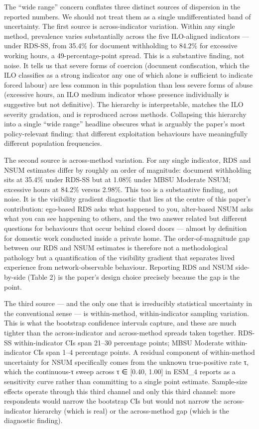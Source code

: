 \documentclass[
  12pt,
  letterpaper,
  DIV=11,
  numbers=noendperiod]{scrartcl}
\begin{document}
The ``wide range'' concern conflates three distinct sources of
dispersion in the reported numbers. We should not treat them as a single
undifferentiated band of uncertainty. The first source is
across-indicator variation. Within any single method, prevalence varies
substantially across the five ILO-aligned indicators --- under RDS-SS,
from 35.4\% for document withholding to 84.2\% for excessive working
hours, a 49-percentage-point spread. This is a substantive finding, not
noise. It tells us that severe forms of coercion (document confiscation,
which the ILO classifies as a strong indicator any one of which alone is
sufficient to indicate forced labour) are less common in this population
than less severe forms of abuse (excessive hours, an ILO medium
indicator whose presence individually is suggestive but not definitive).
The hierarchy is interpretable, matches the ILO severity gradation, and
is reproduced across methods. Collapsing this hierarchy into a single
``wide range'' headline obscures what is arguably the paper's most
policy-relevant finding: that different exploitation behaviours have
meaningfully different population frequencies.

The second source is across-method variation. For any single indicator,
RDS and NSUM estimates differ by roughly an order of magnitude: document
withholding sits at 35.4\% under RDS-SS but at 1.08\% under MBSU
Moderate NSUM; excessive hours at 84.2\% versus 2.98\%. This too is a
substantive finding, not noise. It is the visibility gradient diagnostic
that lies at the centre of this paper's contribution: ego-based RDS asks
what happened to you, alter-based NSUM asks what you can see happening
to others, and the two answer related but different questions for
behaviours that occur behind closed doors --- almost by definition for
domestic work conducted inside a private home. The order-of-magnitude
gap between our RDS and NSUM estimates is therefore not a methodological
pathology but a quantification of the visibility gradient that separates
lived experience from network-observable behaviour. Reporting RDS and
NSUM side-by-side (Table 2) is the paper's design choice precisely
because the gap is the point.

The third source --- and the only one that is irreducibly statistical
uncertainty in the conventional sense --- is within-method,
within-indicator sampling variation. This is what the bootstrap
confidence intervals capture, and these are much tighter than the
across-indicator and across-method spreads taken together. RDS-SS
within-indicator CIs span 21--30 percentage points; MBSU Moderate
within-indicator CIs span 1--4 percentage points. A residual component
of within-method uncertainty for NSUM specifically comes from the
unknown true-positive rate τ, which the continuous-τ sweep across τ ∈
{[}0.40, 1.00{]} in ESM\_4 reports as a sensitivity curve rather than
committing to a single point estimate. Sample-size effects operate
through this third channel and only this third channel: more respondents
would narrow the bootstrap CIs but would not narrow the across-indicator
hierarchy (which is real) or the across-method gap (which is the
diagnostic finding).
\end{document}
